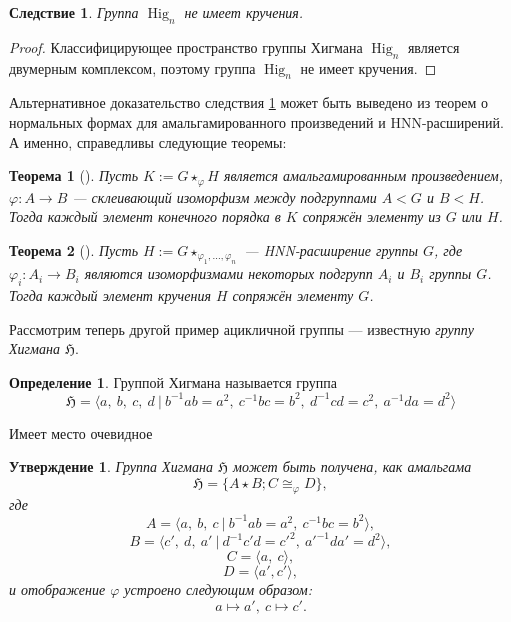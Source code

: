 \documentclass[14pt, dvipsnames, twoside]{extarticle}
\newtheorem{theorem}{Теорема}
\newtheorem{statement}{Утверждение}
\newtheorem{corollary}{Следствие}[theorem]
\theoremstyle{definition}
\newtheorem{defi}{Определение}
\theoremstyle{remark}
\DeclareMathOperator{\Hig}{\mathrm{Hig}}
\begin{document}
\begin{corollary}\label{notorsion}
Группа $\Hig_n$ не имеет кручения. 
\end{corollary}

\begin{proof}
Классифицирующее пространство группы Хигмана $\Hig_n$ является двумерным комплексом, поэтому группа $\Hig_n$ не имеет кручения.
\end{proof}

Альтернативное доказательство следствия \ref{notorsion} может быть выведено из теорем о нормальных формах для амальгамированного произведений и HNN-расширений. А именно, справедливы следующие теоремы:

\begin{theorem}[\cite{Magnus, Serre}]\label{free_product_property}
Пусть $K:= G\star_\varphi H$ является амальгамированным произведением, $\varphi: A\to B$ --- склеивающий изоморфизм между подгруппами $A < G$ и $B < H$. Тогда каждый элемент конечного порядка в $K$ сопряжён элементу из $G$ или $H$.
\end{theorem}

\begin{theorem}[\cite{Magnus, Serre}]\label{HNN_extension_property}
Пусть $H:= G\star_{\varphi_1, ..., \varphi_n}$ --- HNN-расширение группы $G$, где $\varphi_i: A_i\to B_i$ являются изоморфизмами некоторых подгрупп $A_i$ и $B_i$ группы $G$. Тогда каждый элемент кручения $H$ сопряжён элементу $G$.
\end{theorem}












\iffalse

Рассмотрим теперь другой пример ацикличной группы --- известную {\it группу Хигмана $\mathfrak{H}$}.

\begin{defi}
Группой Хигмана называется группа $$\mathfrak{H}=\langle a,\ b,\ c,\ d\ |\ b^{-1}ab=a^2,\ c^{-1}bc=b^2,\ d^{-1}cd=c^2,\ a^{-1}da=d^2 \rangle$$
\end{defi}

Имеет место очевидное

\begin{statement}
Группа Хигмана $\mathfrak{H}$ может быть получена, как амальгама $$\mathfrak{H}=\{ A\star B; C\cong_\varphi D\},$$ где $$A=\langle a,\  b,\ c\ |\ b^{-1}ab=a^2,\ c^{-1}bc=b^2  \rangle,$$ $$B=\langle c',\ d,\ a'\ |\ d^{-1}c'd=c'^2,\ a'^{-1}da'=d^2\rangle,$$ $$C=\langle a,\ c\rangle,$$ $$D=\langle a', c' \rangle,$$ и отображение $\varphi$ устроено следующим образом: $$a\mapsto a',\ c\mapsto c'.$$
\end{statement}
\end{document}
